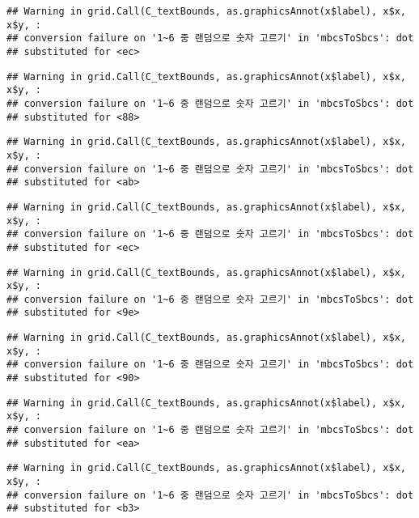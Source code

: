 \documentclass[]{book}
\begin{document}
\begin{verbatim}
## Warning in grid.Call(C_textBounds, as.graphicsAnnot(x$label), x$x, x$y, :
## conversion failure on '1~6 중 랜덤으로 숫자 고르기' in 'mbcsToSbcs': dot
## substituted for <ec>
\end{verbatim}

\begin{verbatim}
## Warning in grid.Call(C_textBounds, as.graphicsAnnot(x$label), x$x, x$y, :
## conversion failure on '1~6 중 랜덤으로 숫자 고르기' in 'mbcsToSbcs': dot
## substituted for <88>
\end{verbatim}

\begin{verbatim}
## Warning in grid.Call(C_textBounds, as.graphicsAnnot(x$label), x$x, x$y, :
## conversion failure on '1~6 중 랜덤으로 숫자 고르기' in 'mbcsToSbcs': dot
## substituted for <ab>
\end{verbatim}

\begin{verbatim}
## Warning in grid.Call(C_textBounds, as.graphicsAnnot(x$label), x$x, x$y, :
## conversion failure on '1~6 중 랜덤으로 숫자 고르기' in 'mbcsToSbcs': dot
## substituted for <ec>
\end{verbatim}

\begin{verbatim}
## Warning in grid.Call(C_textBounds, as.graphicsAnnot(x$label), x$x, x$y, :
## conversion failure on '1~6 중 랜덤으로 숫자 고르기' in 'mbcsToSbcs': dot
## substituted for <9e>
\end{verbatim}

\begin{verbatim}
## Warning in grid.Call(C_textBounds, as.graphicsAnnot(x$label), x$x, x$y, :
## conversion failure on '1~6 중 랜덤으로 숫자 고르기' in 'mbcsToSbcs': dot
## substituted for <90>
\end{verbatim}

\begin{verbatim}
## Warning in grid.Call(C_textBounds, as.graphicsAnnot(x$label), x$x, x$y, :
## conversion failure on '1~6 중 랜덤으로 숫자 고르기' in 'mbcsToSbcs': dot
## substituted for <ea>
\end{verbatim}

\begin{verbatim}
## Warning in grid.Call(C_textBounds, as.graphicsAnnot(x$label), x$x, x$y, :
## conversion failure on '1~6 중 랜덤으로 숫자 고르기' in 'mbcsToSbcs': dot
## substituted for <b3>
\end{verbatim}
\end{document}
